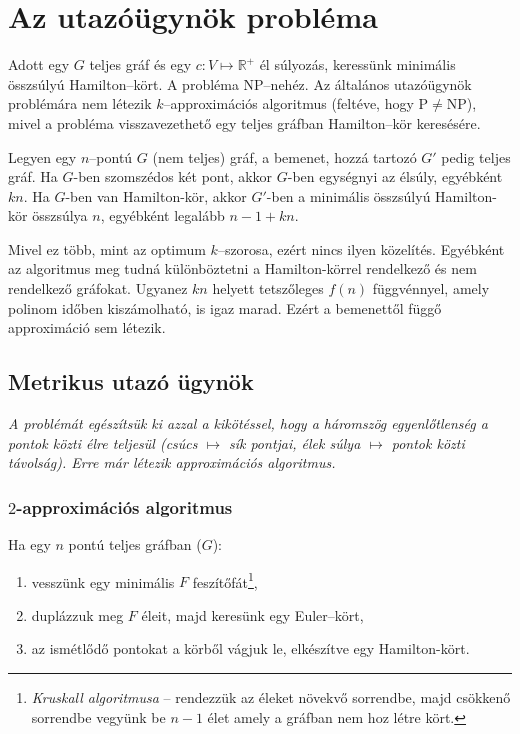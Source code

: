 \skiptooddpage 
\section{Az utazóügynök probléma}

Adott egy $G$ teljes gráf és egy $c:V \mapsto \mathbb{R}^+$ él súlyozás,
keressünk minimális összsúlyú Hamilton--kört. A probléma NP--nehéz. Az általános
utazóügynök problémára nem létezik $k$--approximációs algoritmus (feltéve, hogy
P$\ne$NP), mivel a probléma visszavezethető egy teljes gráfban Hamilton--kör
keresésére.

Legyen egy $n$--pontú $G$ (nem teljes) gráf, a bemenet, hozzá tartozó $G'$ pedig
teljes gráf. Ha $G$-ben szomszédos két pont, akkor $G$-ben egységnyi az élsúly,
egyébként $kn$. Ha $G$-ben van Hamilton-kör, akkor $G'$-ben a minimális
összsúlyú Hamilton-kör összsúlya $n$, egyébként legalább $n-1+kn$. 

Mivel ez több, mint az optimum $k$--szorosa, ezért nincs ilyen közelítés.
Egyébként az algoritmus meg tudná különböztetni a Hamilton-körrel rendelkező és
nem rendelkező gráfokat. Ugyanez $kn$ helyett tetszőleges $f(n)$ függvénnyel,
amely polinom időben kiszámolható, is igaz marad. Ezért a bemenettől függő
approximáció sem létezik.

\subsection{Metrikus utazó ügynök}

\emph{A problémát egészítsük ki azzal a kikötéssel, hogy a háromszög
egyenlőtlenség a pontok közti élre teljesül (csúcs $\mapsto$ sík pontjai, élek
súlya $\mapsto$ pontok közti távolság). Erre már létezik approximációs
algoritmus.}

\subsubsection{$2$-approximációs algoritmus}

Ha egy $n$ pontú teljes gráfban ($G$):
\begin{enumerate}
  \item vesszünk egy minimális $F$ feszítőfát\footnote{\emph{Kruskall algoritmusa} -- 
rendezzük az éleket növekvő sorrendbe, majd csökkenő sorrendbe vegyünk be $n-1$ élet
amely a gráfban nem hoz létre kört.},
  \item duplázzuk meg $F$ éleit, majd keresünk egy Euler--kört,
  \item az ismétlődő pontokat a körből vágjuk le, elkészítve egy Hamilton-kört.
\end{enumerate}

